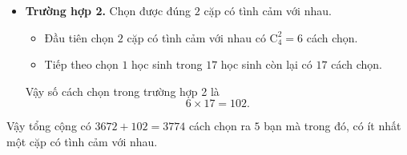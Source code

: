 \begin{bt}
{\begin{itemize}
		\item \textbf{Trường hợp 2.} Chọn được đúng $2$ cặp có tình cảm với nhau.
		\begin{itemize}
			\item Đầu tiên chọn $2$ cặp có tình cảm với nhau có $\mathrm{C}_4^2=6$ cách chọn.
			\item Tiếp theo chọn $1$ học sinh trong $17$ học sinh còn lại có $17$ cách chọn.
		\end{itemize}
			Vậy số cách chọn trong trường hợp 2 là \[6\times17=102.\]
		\end{itemize}
	Vậy tổng cộng có $3672+102=3774$ cách chọn ra $5$ bạn mà trong đó, có ít nhất một cặp có tình cảm với nhau.
	}
\end{bt}



